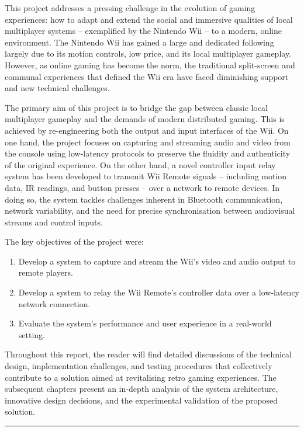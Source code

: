 \label{chapter:introduction}

This project addresses a pressing challenge in the evolution of gaming experiences: how to adapt and extend the social and immersive qualities of local multiplayer systems -- exemplified by the Nintendo Wii -- to a modern, online environment. The Nintendo Wii has gained a large and dedicated following largely due to its motion controls, low price, and its local multiplayer gameplay. However, as online gaming has become the norm, the traditional split-screen and communal experiences that defined the Wii era have faced diminishing support and new technical challenges.

The primary aim of this project is to bridge the gap between classic local multiplayer gameplay and the demands of modern distributed gaming. This is achieved by re-engineering both the output and input interfaces of the Wii. On one hand, the project focuses on capturing and streaming audio and video from the console using low-latency protocols to preserve the fluidity and authenticity of the original experience. On the other hand, a novel controller input relay system has been developed to transmit Wii Remote signals -- including motion data, IR readings, and button presses -- over a network to remote devices. In doing so, the system tackles challenges inherent in Bluetooth communication, network variability, and the need for precise synchronisation between audiovisual streams and control inputs.

The key objectives of the project were:
\begin{enumerate}
\item  Develop a system to capture and stream the Wii’s video and audio output to remote players.
\item Develop a system to relay the Wii Remote’s controller data over a low-latency network connection.
\item Evaluate the system’s performance and user experience in a real-world setting.
\end{enumerate}

Throughout this report, the reader will find detailed discussions of the technical design, implementation challenges, and testing procedures that collectively contribute to a solution aimed at revitalising retro gaming experiences. The subsequent chapters present an in-depth analysis of the system architecture, innovative design decisions, and the experimental validation of the proposed solution.


\begin{center}
	\noindent\rule{8cm}{0.4pt}
\end{center}



